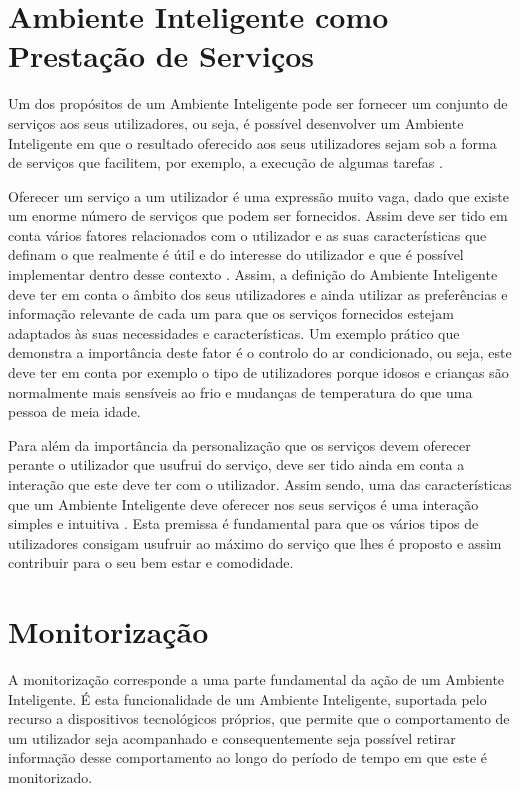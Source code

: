 \section{Ambiente Inteligente como Prestação de Serviços}
Um dos propósitos de um Ambiente Inteligente pode ser fornecer um conjunto de serviços aos seus utilizadores, ou seja, é possível desenvolver um Ambiente Inteligente em que o resultado oferecido aos seus utilizadores sejam sob a forma de serviços que facilitem, por exemplo, a execução de algumas tarefas \cite{stavropoulos2011survey}.

Oferecer um serviço a um utilizador é uma expressão muito vaga, dado que existe um enorme número de serviços que podem ser fornecidos. Assim deve ser tido em conta vários fatores relacionados com o utilizador e as suas características que definam o que realmente é útil e do interesse do utilizador e que é possível implementar dentro desse contexto \cite{stavropoulos2011survey}. Assim, a definição do Ambiente Inteligente deve ter em conta o âmbito dos seus utilizadores e ainda utilizar as preferências e informação relevante de cada um para que os serviços fornecidos estejam adaptados às suas necessidades e características. Um exemplo prático que demonstra a importância deste fator é o controlo do ar condicionado, ou seja, este deve ter em conta por exemplo o tipo de utilizadores porque idosos e crianças são normalmente mais sensíveis ao frio e mudanças de temperatura do que uma pessoa de meia idade.

Para além da importância da personalização que os serviços devem oferecer perante o utilizador que usufrui do serviço, deve ser tido ainda em conta a interação que este deve ter com o utilizador. Assim sendo, uma das características que um Ambiente Inteligente deve oferecer nos seus serviços é uma interação simples e intuitiva \cite{stavropoulos2011survey}. Esta premissa é fundamental para que os vários tipos de utilizadores consigam usufruir ao máximo do serviço que lhes é proposto e assim contribuir para o seu bem estar e comodidade.

\section{Monitorização}
A monitorização \cite{levin1999fundamentals, salber1999designing} corresponde a uma parte fundamental da ação de um Ambiente Inteligente. É esta funcionalidade de um Ambiente Inteligente, suportada pelo recurso a dispositivos tecnológicos próprios, que permite que o comportamento de um utilizador seja acompanhado e consequentemente seja possível retirar informação desse comportamento ao longo do período de tempo em que este é monitorizado.

